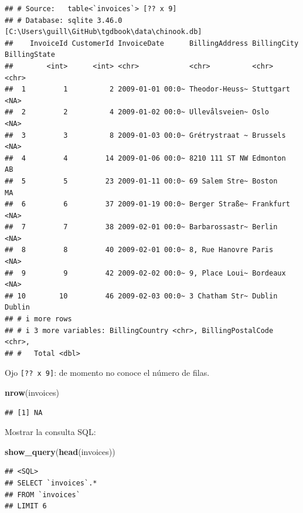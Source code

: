 \documentclass[
]{book}
\newenvironment{Shaded}{\begin{snugshade}}{\end{snugshade}}
\newcommand{\FunctionTok}[1]{\textcolor[rgb]{0.13,0.29,0.53}{\textbf{#1}}}
\newcommand{\NormalTok}[1]{#1}
\begin{document}
\begin{verbatim}
## # Source:   table<`invoices`> [?? x 9]
## # Database: sqlite 3.46.0 [C:\Users\guill\GitHub\tgdbook\data\chinook.db]
##    InvoiceId CustomerId InvoiceDate      BillingAddress BillingCity BillingState
##        <int>      <int> <chr>            <chr>          <chr>       <chr>       
##  1         1          2 2009-01-01 00:0~ Theodor-Heuss~ Stuttgart   <NA>        
##  2         2          4 2009-01-02 00:0~ Ullevålsveien~ Oslo        <NA>        
##  3         3          8 2009-01-03 00:0~ Grétrystraat ~ Brussels    <NA>        
##  4         4         14 2009-01-06 00:0~ 8210 111 ST NW Edmonton    AB          
##  5         5         23 2009-01-11 00:0~ 69 Salem Stre~ Boston      MA          
##  6         6         37 2009-01-19 00:0~ Berger Straße~ Frankfurt   <NA>        
##  7         7         38 2009-02-01 00:0~ Barbarossastr~ Berlin      <NA>        
##  8         8         40 2009-02-01 00:0~ 8, Rue Hanovre Paris       <NA>        
##  9         9         42 2009-02-02 00:0~ 9, Place Loui~ Bordeaux    <NA>        
## 10        10         46 2009-02-03 00:0~ 3 Chatham Str~ Dublin      Dublin      
## # i more rows
## # i 3 more variables: BillingCountry <chr>, BillingPostalCode <chr>,
## #   Total <dbl>
\end{verbatim}

Ojo \texttt{{[}??\ x\ 9{]}}: de momento no conoce el número de filas.

\begin{Shaded}
\begin{Highlighting}[]
\FunctionTok{nrow}\NormalTok{(invoices)}
\end{Highlighting}
\end{Shaded}

\begin{verbatim}
## [1] NA
\end{verbatim}

Mostrar la consulta SQL:

\begin{Shaded}
\begin{Highlighting}[]
\FunctionTok{show\_query}\NormalTok{(}\FunctionTok{head}\NormalTok{(invoices))}
\end{Highlighting}
\end{Shaded}

\begin{verbatim}
## <SQL>
## SELECT `invoices`.*
## FROM `invoices`
## LIMIT 6
\end{verbatim}
\end{document}
